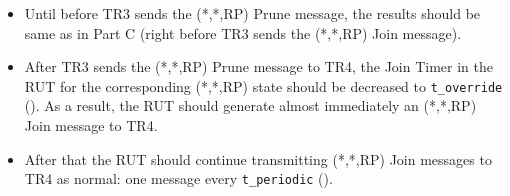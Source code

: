 \documentclass[11pt]{report}
\begin{document}

\begin{itemize}

  \item Until before TR3 sends the (*,*,RP) Prune message, the results should
  be same as in Part C (right before TR3 sends the (*,*,RP) Join message).

  \item After TR3 sends the (*,*,RP) Prune message to TR4,
  the Join Timer in the RUT for the corresponding (*,*,RP) state
  should be decreased to \verb=t_override= ({\PimsmTOverride}). As a result,
  the RUT should generate almost immediately an (*,*,RP) Join message to TR4.

  \item After that the RUT should continue transmitting 
  (*,*,RP) Join messages to TR4 as normal: one message every \verb=t_periodic=
  ({\PimsmTPeriodic}).

\end{itemize}

\end{document}
